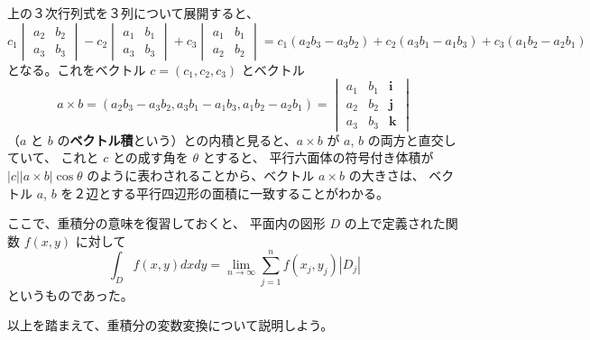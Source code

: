 \documentclass[a4paper]{jsarticle}
\theoremstyle{definition}
\theoremstyle{remark}
\begin{document}
上の３次行列式を３列について展開すると、
\[
  c_1
  \begin{vmatrix}
    a_2 & b_2\\
    a_3 & b_3
  \end{vmatrix}
  - c_2
  \begin{vmatrix}
    a_1 & b_1\\
    a_3 & b_3
  \end{vmatrix}
  + c_3
  \begin{vmatrix}
    a_1 & b_1\\
    a_2 & b_2
  \end{vmatrix}
  = c_1(a_2b_3 - a_3 b_2) + c_2(a_3b_1 - a_1 b_3) + c_3(a_1b_2 - a_2b_1)
\]
となる。これをベクトル $c = (c_1,c_2,c_3)$ とベクトル
\[
  a\times b = (a_2b_3-a_3b_2, a_3b_1 - a_1b_3, a_1b_2 - a_2b_1)
  = \begin{vmatrix}
a_1 & b_1 & \mathbf{i}\\
a_2 & b_2 & \mathbf{j}\\
a_3 & b_3 & \mathbf{k}
\end{vmatrix}
\]
（$a$ と $b$ の\textbf{ベクトル積}という）との内積と見ると、$a\times b$ が $a$, $b$ の両方と直交していて、
これと $c$ との成す角を $\theta$ とすると、
平行六面体の符号付き体積が $|c| |a\times b| \cos\theta$ のように表わされることから、ベクトル $a\times b$ の大きさは、
ベクトル $a$, $b$ を２辺とする平行四辺形の面積に一致することがわかる。

\bigskip
ここで、重積分の意味を復習しておくと、
平面内の図形 $D$ の上で定義された関数 $f(x,y)$ に対して
\[
\int_D f(x,y)dxdy = \lim_{n\to\infty} \sum_{j=1}^n 
f(x_j,y_j) |D_j| 
\]
というものであった。

以上を踏まえて、重積分の変数変換について説明しよう。
\end{document}
